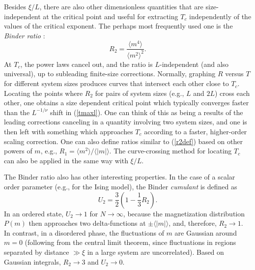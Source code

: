 \documentclass[draft,numberedheadings]{aipproc}
\begin{document}
Besides $\xi/L$, there are also other dimensionless quantities that are size-independent at the critical point and useful for extracting $T_c$ independently 
of the values of the critical exponent. The perhaps most frequently used one is the {\it Binder ratio} \cite{binder81,binder84}:
\begin{equation}
R_2 = \frac{\langle m^4\rangle}{\langle m^2\rangle^2}.
\label{r2def}
\end{equation}
At $T_c$, the power laws cancel out, and the ratio is $L$-independent (and also universal), up to subleading finite-size corrections. Normally, 
graphing $R$ versus $T$ for different system sizes produces curves that intersect each other close to $T_c$. Locating the points where $R_2$ for 
pairs of system sizes (e.g., $L$ and $2L$) cross each other, one obtains a size dependent critical point which typically converges faster than 
the $L^{-1/\nu}$ shift in (\ref{tmaxl}). One can think of this as being a results of the leading corrections canceling in a quantity involving two 
system sizes, and one is then left with something which approaches $T_c$ according to a faster, higher-order scaling correction. One can also define ratios 
similar to (\ref{r2def}) based on other powers of $m$, e.g., $R_1 = \langle m^2\rangle/\langle |m|\rangle$. The curve-crossing method for
locating $T_c$ can also be applied in the same way with $\xi/L$.

The Binder ratio also has other interesting properties. In the case of a scalar order parameter (e.g., for the Ising model), the Binder {\it cumulant} 
is defined as 
\begin{equation}
U_2 = \frac{3}{2} \left (1- \frac{1}{3}R_2 \right ).
\label{u2def}
\end{equation}
In an ordered state, $U_2 \to 1$ for $N\to \infty$, because the magnetization distribution $P(m)$ then approaches two delta-functions at 
$\pm \langle |m|\rangle$, and, therefore, $R_2\to 1$. In contrast, in a disordered phase, the fluctuations of $m$ are Gaussian around $m=0$ 
(following from the central limit theorem, since fluctuations in regions separated by distance $\gg \xi$ in a large system are uncorrelated). 
Based on Gaussian integrals, $R_2\to 3$ and $U_2\to 0$. 
\end{document}
